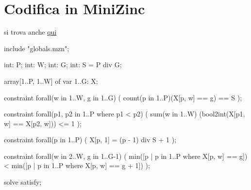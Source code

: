 \documentclass[12pt]{article}
\begin{document}
\section{Codifica in MiniZinc}

si trova anche \href{https://github.com/AglaiaNorza/ia/blob/main/CSP/E.A.5.8/E.A.5.8.mzn}{qui}

\begin{mznbox}{}
include "globals.mzn";

int: P;
int: W;
int: G;
int: S = P div G;

array[1..P, 1..W] of var 1..G: X;


constraint forall(w in 1..W, g in 1..G) (
    count(p in 1..P)(X[p, w] == g) == S
);

constraint forall(p1, p2 in 1..P where p1 < p2) (
    sum(w in 1..W) (bool2int(X[p1, w] == X[p2, w])) <= 1 
);


constraint forall(p in 1..P) (
    X[p, 1] = (p - 1) div S + 1
);

constraint forall(w in 2..W, g in 1..G-1) (
    min([p | p in 1..P where X[p, w] == g]) < 
    min([p | p in 1..P where X[p, w] == g + 1])
);


solve satisfy;
\end{mznbox}
\end{document}

